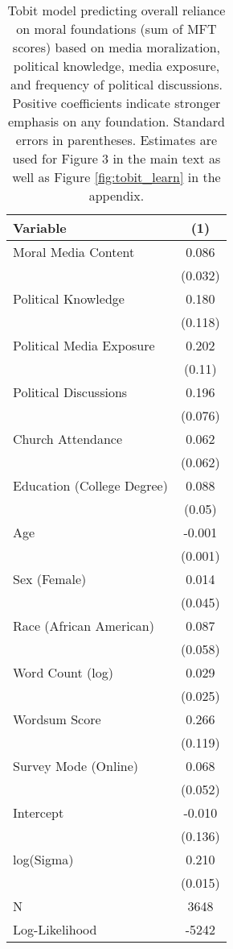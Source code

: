 \begin{table}[ht]
\centering
\caption{Tobit model predicting overall reliance on moral foundations
           (sum of MFT scores) based on media moralization, political knowledge, media exposure, and frequency of 
           political discussions. Positive coefficients indicate stronger emphasis on any foundation.
           Standard errors in parentheses. Estimates are used for Figure 3 in 
           the main text as well as Figure \ref{fig:tobit_learn} in the appendix.} 
\label{tab:tobit_learn}
\begingroup\footnotesize
\begin{tabular}{lc}
  \hline
Variable & (1) \\ 
  \hline
Moral Media Content &  0.086 \\ 
   & (0.032) \\ 
  Political Knowledge &  0.180 \\ 
   & (0.118) \\ 
  Political Media Exposure &  0.202 \\ 
   & (0.11) \\ 
  Political
Discussions &  0.196 \\ 
   & (0.076) \\ 
  Church Attendance &  0.062 \\ 
   & (0.062) \\ 
  Education (College Degree) &  0.088 \\ 
   & (0.05) \\ 
  Age & -0.001 \\ 
   & (0.001) \\ 
  Sex (Female) &  0.014 \\ 
   & (0.045) \\ 
  Race (African American) &  0.087 \\ 
   & (0.058) \\ 
  Word Count (log) &  0.029 \\ 
   & (0.025) \\ 
  Wordsum Score &  0.266 \\ 
   & (0.119) \\ 
  Survey Mode (Online) &  0.068 \\ 
   & (0.052) \\ 
  Intercept & -0.010 \\ 
   & (0.136) \\ 
  log(Sigma) &  0.210 \\ 
   & (0.015) \\ 
   \hline
N & 3648 \\ 
  Log-Likelihood & -5242 \\ 
   \hline
\end{tabular}
\endgroup
\end{table}
